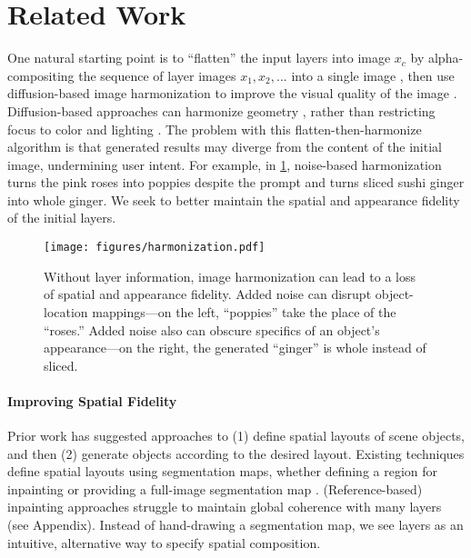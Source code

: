 \vspace{-1.5em}
\section{Related Work}
\vspace{-0.5em}

One natural starting point is to ``flatten'' the input layers into image $x_c$ by alpha-compositing the sequence of layer images $x_1, x_2, ...$ into a single image \cite{porter1984compositing}, then use diffusion-based image harmonization to improve the visual quality of the image \cite{sdedit,avrahami2022blended,saharia2022palette}. 
Diffusion-based approaches can harmonize geometry \cite{sdedit,objectstitch}, rather than restricting focus to color and lighting \cite{cong2020dovenet,cong2021bargainnet,hong2022shadow,xue2022dccf}.
The problem with this flatten-then-harmonize algorithm is that generated results may diverge from the content of the initial image, undermining user intent. For example, in \cref{figure:ca_ft_motivation}, noise-based harmonization \cite{sdedit} turns the pink roses into poppies despite the prompt and turns sliced sushi ginger into whole ginger. 
We seek to better maintain the spatial and appearance fidelity of the initial layers. 

\begin{figure}
    \centering
    \texttt{[image: figures/harmonization.pdf]}
    \caption{Without layer information, image harmonization can lead to a loss of spatial and appearance fidelity. Added noise can disrupt object-location mappings---on the left, ``poppies'' take the place of the ``roses.'' Added noise also can obscure specifics of an object's appearance---on the right, the generated ``ginger'' is whole instead of sliced.}
    \label{figure:ca_ft_motivation}
\end{figure}

\vspace{-1.5em}
\paragraph{Improving Spatial Fidelity}

Prior work has suggested approaches to (1) define spatial layouts of scene objects, and then (2) generate objects according to the desired layout. 
Existing techniques define spatial layouts using segmentation maps, whether defining a region for inpainting \cite{avrahami2022blended,sdedit,objectstitch,chen2023anydoor,yang2023paint} or providing a full-image segmentation map \cite{spatext,ediffi}. 
(Reference-based) inpainting approaches struggle to maintain global coherence with many layers (see Appendix). 
Instead of hand-drawing a segmentation map, we see layers as an intuitive, alternative way to specify spatial composition. 
\vspace{-1.5em}

